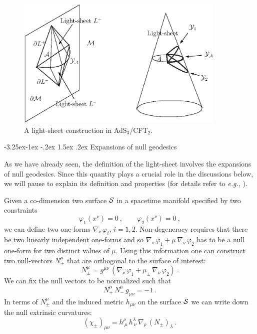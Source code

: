 \documentclass[12pt]{article}
\makeatletter
\renewcommand\subsection{\@startsection{subsection}{2}{\z@}%
                                     {-3.25ex\@plus -1ex \@minus -.2ex}%
                                     {1.5ex \@plus .2ex}%
                                     {\normalfont\bfseries}}
\newcommand{\be}{\begin{equation}}
\newcommand{\ee}{\end{equation}}
\def\({\left (}
\def\){\right )}
\def\eg{{\it e.g.}}
\def\vp{\varphi}
\def\CS{{\cal S}}
\def\ms{\CS}
\def\ads#1{AdS$_{#1}$}
\def\vp{\varphi}
\makeatother
\begin{document}
\begin{figure}
\begin{center}
\includegraphics[width=10cm]{ads3}
\caption{A light-sheet construction in  \ads{3}/CFT$_2$.}
\label{lightsheets}
\end{center}
\end{figure}


\subsection{Expansions of null geodesics}
\label{nexpansion}

As we have already seen, the definition of the
light-sheet involves the expansions of null geodesics. Since this
quantity plays a crucial role in the discussions below, we will
pause to explain its definition and properties (for details
refer to \eg, \cite{Hawking:1973uf, Bousso:2001cf, Ashtekar:2004cn}).

 Given a co-dimension two surface $\ms$ in a spacetime
manifold specified by two constraints
%
\be
\vp_{1}(x^\nu) = 0 \ , \qquad  \vp_{2}(x^\nu) = 0 \ , \ee
%
we can define two one-forms
$\nabla_{\! \nu} \, \vp_{i}$, $i=1,2$. Non-degeneracy requires that there be two
linearly independent one-forms and so $\nabla_{\! \nu} \, \vp_{1} + \mu \,
\nabla_{\! \nu} \, \vp_{2}$ has to be a null one-form for two distinct
values of $\mu$. Using this information one can construct two
null-vectors $N_\pm^\mu$ that are orthogonal to the surface of
interest:
%
\be N_\pm^\mu  =g^{\mu\nu} \, \(\nabla_{\! \nu} \, \vp_{1} + \mu_\pm \,
\nabla_{\! \nu} \, \vp_{2}\)  \ .
\ee
%
We can fix the null vectors to be normalized such that
%
\be N_{+}^\mu \, N_{-}^{\nu} \, g_{\mu\nu} =-1 \ . \ee
%
In terms of $N_\pm^\mu$ and the induced metric $h_{\mu\nu}$ on the surface $\ms$
 we can write down the null extrinsic curvatures:
%
\be (\chi_\pm)_{\mu\nu} = h_{\ \mu}^\rho \,h_{\ \nu}^\lambda \, \nabla_{\! \rho}
\, (N_\pm)_{\lambda} \ . \ee
%
\end{document}
